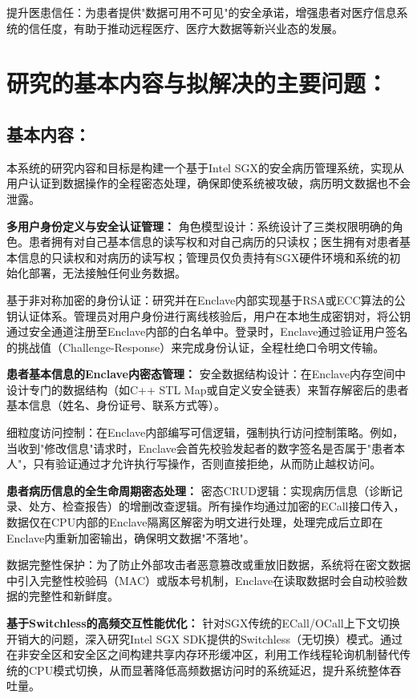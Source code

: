 \documentclass{article}
\begin{document}
提升医患信任：为患者提供"数据可用不可见"的安全承诺，增强患者对医疗信息系统的信任度，有助于推动远程医疗、医疗大数据等新兴业态的发展。

\vspace{0.8cm}
\fullwidthrule

\section{研究的基本内容与拟解决的主要问题：}
\subsection*{基本内容：}
本系统的研究内容和目标是构建一个基于Intel SGX的安全病历管理系统，实现从用户认证到数据操作的全程密态处理，确保即使系统被攻破，病历明文数据也不会泄露。

\textbf{多用户身份定义与安全认证管理：}
角色模型设计：系统设计了三类权限明确的角色。患者拥有对自己基本信息的读写权和对自己病历的只读权；医生拥有对患者基本信息的只读权和对病历的读写权；管理员仅负责持有SGX硬件环境和系统的初始化部署，无法接触任何业务数据。

基于非对称加密的身份认证：研究并在Enclave内部实现基于RSA或ECC算法的公钥认证体系。管理员对用户身份进行离线核验后，用户在本地生成密钥对，将公钥通过安全通道注册至Enclave内部的白名单中。登录时，Enclave通过验证用户签名的挑战值（Challenge-Response）来完成身份认证，全程杜绝口令明文传输。

\textbf{患者基本信息的Enclave内密态管理：}
安全数据结构设计：在Enclave内存空间中设计专门的数据结构（如C++ STL Map或自定义安全链表）来暂存解密后的患者基本信息（姓名、身份证号、联系方式等）。

细粒度访问控制：在Enclave内部编写可信逻辑，强制执行访问控制策略。例如，当收到"修改信息"请求时，Enclave会首先校验发起者的数字签名是否属于"患者本人"，只有验证通过才允许执行写操作，否则直接拒绝，从而防止越权访问。

\textbf{患者病历信息的全生命周期密态处理：}
密态CRUD逻辑：实现病历信息（诊断记录、处方、检查报告）的增删改查逻辑。所有操作均通过加密的ECall接口传入，数据仅在CPU内部的Enclave隔离区解密为明文进行处理，处理完成后立即在Enclave内重新加密输出，确保明文数据"不落地"。

数据完整性保护：为了防止外部攻击者恶意篡改或重放旧数据，系统将在密文数据中引入完整性校验码（MAC）或版本号机制，Enclave在读取数据时会自动校验数据的完整性和新鲜度。

\textbf{基于Switchless的高频交互性能优化：}
针对SGX传统的ECall/OCall上下文切换开销大的问题，深入研究Intel SGX SDK提供的Switchless（无切换）模式。通过在非安全区和安全区之间构建共享内存环形缓冲区，利用工作线程轮询机制替代传统的CPU模式切换，从而显著降低高频数据访问时的系统延迟，提升系统整体吞吐量。
\end{document}

